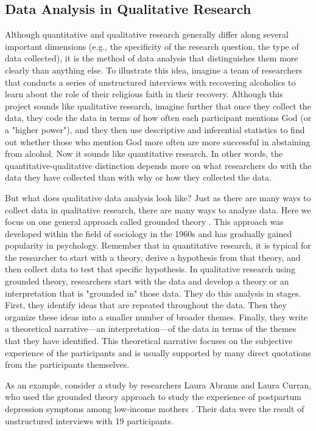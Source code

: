 \subsection{Data Analysis in Qualitative Research}

Although quantitative and qualitative research generally differ along several important dimensions (e.g., the specificity of the research question, the type of data collected), it is the method of data analysis that distinguishes them more clearly than anything else. To illustrate this idea, imagine a team of researchers that conducts a series of unstructured interviews with recovering alcoholics to learn about the role of their religious faith in their recovery. Although this project sounds like qualitative research, imagine further that once they collect the data, they code the data in terms of how often each participant mentions God (or a "higher power"), and they then use descriptive and inferential statistics to find out whether those who mention God more often are more successful in abstaining from alcohol. Now it sounds like quantitative research. In other words, the quantitative-qualitative distinction depends more on what researchers do with the data they have collected than with why or how they collected the data.

But what does qualitative data analysis look like? Just as there are many ways to collect data in qualitative research, there are many ways to analyze data. Here we focus on one general approach called grounded theory \citep{glaser_discovery_1968}. This approach was developed within the field of sociology in the 1960s and has gradually gained popularity in psychology. Remember that in quantitative research, it is typical for the researcher to start with a theory, derive a hypothesis from that theory, and then collect data to test that specific hypothesis. In qualitative research using grounded theory, researchers start with the data and develop a theory or an interpretation that is "grounded in" those data. They do this analysis in stages. First, they identify ideas that are repeated throughout the data. Then they organize these ideas into a smaller number of broader themes. Finally, they write a theoretical narrative---an interpretation---of the data in terms of the themes that they have identified. This theoretical narrative focuses on the subjective experience of the participants and is usually supported by many direct quotations from the participants themselves.

As an example, consider a study by researchers Laura Abrams and Laura Curran, who used the grounded theory approach to study the experience of postpartum depression symptoms among low-income mothers \citep{abrams_and_2009}. Their data were the result of unstructured interviews with 19 participants.

